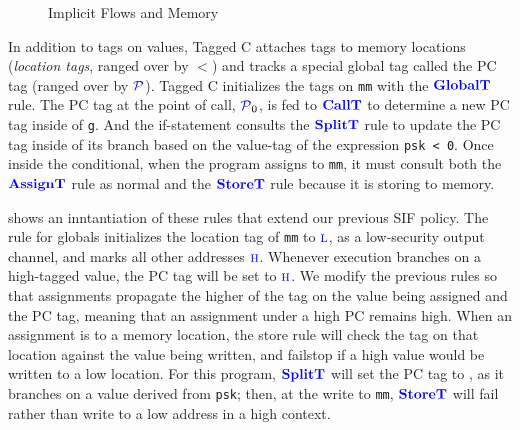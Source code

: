 \documentclass{llncs}
\begin{document}
\begin{figure}
\caption{Implicit Flows and Memory}
\label{fig:ex2}
\end{figure}

In addition to tags on values, Tagged C attaches tags to memory locations ({\em location tags}, ranged over by
\(\lt\)) and tracks a special global tag called the PC tag (ranged over by \(\mathcal{\color{blue} P\mathit{}}\)).
Tagged C initializes the tags on {\tt mm} with the \(\color{blue} \mathbf{GlobalT}\) rule. The PC tag
at the point of call, \(\mathcal{\color{blue} P\mathit{}}_0\), is fed to \(\color{blue} \mathbf{CallT}\) to determine a new PC tag
inside of {\tt g}. And the if-statement consults the \(\color{blue} \mathbf{SplitT}\) rule to update the PC tag
inside of its branch based on the value-tag of the expression {\tt psk < 0}. Once inside the
conditional, when the program assigns to {\tt mm}, it must consult both the
\(\color{blue} \mathbf{AssignT}\) rule as normal and the \(\color{blue} \mathbf{StoreT}\) rule because it is storing
to memory.

 shows an inntantiation of these rules that  extend our previous SIF policy.
The rule for globals initializes the location tag of {\tt mm} to \(\textnormal{\color{blue} \sc l}\),
as a low-security output channel, and marks all other addresses \(\textnormal{\color{blue} \sc h}\). Whenever execution branches on
a high-tagged value, the PC tag will be set to \(\textnormal{\color{blue} \sc h}\). We modify the previous rules so that
assignments propagate the higher of the tag on the value being assigned and the PC tag, meaning that an
assignment under a high PC remains high.
When an assignment is to a memory location, the store rule will check the tag on
that location against the value being written, 
and failstop if a high value would be written to a low location.
For this program, \(\color{blue} \mathbf{SplitT}\) will set the PC tag to \high, as it branches on a value derived from {\tt psk}; 
then, at the write to {\tt mm}, \(\color{blue} \mathbf{StoreT}\) will fail rather than write to a low address
in a high context.
\end{document}
